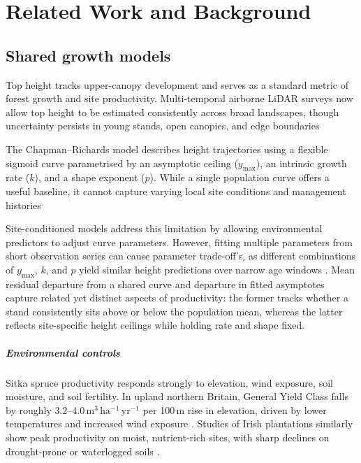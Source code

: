 \documentclass[logo,msc,ai]{infthesis}           %
\begin{document}
\chapter{Related Work and Background}

\section*{Shared growth models}
Top height tracks upper-canopy development and serves as a standard metric of forest growth and site productivity. Multi-temporal airborne LiDAR surveys now allow top height to be estimated consistently across broad landscapes, though uncertainty persists in young stands, open canopies, and edge boundaries \cite{ForestResearch2026Sitka_C1_SS, suarezminguez2008Practical_C1_SS}

The Chapman--Richards model describes height trajectories using a flexible sigmoid curve parametrised by an asymptotic ceiling ($y_{\max}$), an intrinsic growth rate ($k$), and a shape exponent ($p$). While a single population curve offers a useful baseline, it cannot capture varying local site conditions and management histories \cite{richards1959Flexible_C2_CR, pommerening2015Methods_C2_CR, mason2011Sitka_C1_SS}

Site-conditioned models address this limitation by allowing environmental predictors to adjust curve parameters. However, fitting multiple parameters from short observation series can cause parameter trade-off's, as different combinations of $y_{\max}$, $k$, and $p$ yield similar height predictions over narrow age windows \cite{scolforo2013Dominant_C2_CR, socha2021Regional_C2_CR, rennolls1995Forest_C2_CR}. Mean residual departure from a shared curve and departure in fitted asymptotes capture related yet distinct aspects of productivity: the former tracks whether a stand consistently sits above or below the population mean, whereas the latter reflects site-specific height ceilings while holding rate and shape fixed.

\paragraph*{Environmental controls}
Sitka spruce productivity responds strongly to elevation, wind exposure, soil moisture, and soil fertility. In upland northern Britain, General Yield Class falls by roughly $3.2\text{--}4.0\,\mathrm{m^3\,ha^{-1}\,yr^{-1}}$ per 100\,m rise in elevation, driven by lower temperatures and increased wind exposure \cite{worrell1990Productivity1_C1_SS}. Studies of Irish plantations similarly show peak productivity on moist, nutrient-rich sites, with sharp declines on drought-prone or waterlogged soils \cite{farrelly2011Sitka_C1_SS}.
\end{document}
